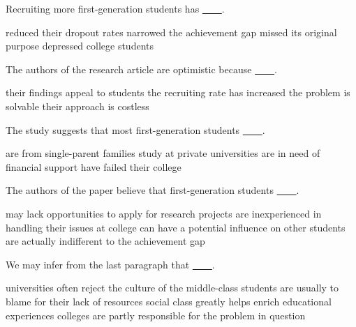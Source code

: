 \item Recruiting more first-generation students has \uline{~~~~}.
\begin{tasks}
	\task reduced their dropout rates
	\task narrowed the achievement gap
	\task missed its original purpose
	\task depressed college students
\end{tasks}
\item The authors of the research article are optimistic because \uline{~~~~}.
\begin{tasks}
	\task their findings appeal to students
	\task the recruiting rate has increased
	\task the problem is solvable
	\task their approach is costless
\end{tasks}
\item The study suggests that most first-generation students \uline{~~~~}.
\begin{tasks}
	\task are from single-parent families
	\task study at private universities
	\task are in need of financial support
	\task have failed their college
\end{tasks}
\item The authors of the paper believe that first-generation students \uline{~~~~}.
\begin{tasks}
	\task may lack opportunities to apply for research projects
	\task are inexperienced in handling their issues at college
	\task can have a potential influence on other students
	\task are actually indifferent to the achievement gap
\end{tasks}
\item We may infer from the last paragraph that \uline{~~~~}.
\begin{tasks}
	\task universities often reject the culture of the middle-class
	\task students are usually to blame for their lack of resources
	\task social class greatly helps enrich educational experiences
	\task colleges are partly responsible for the problem in question
\end{tasks}